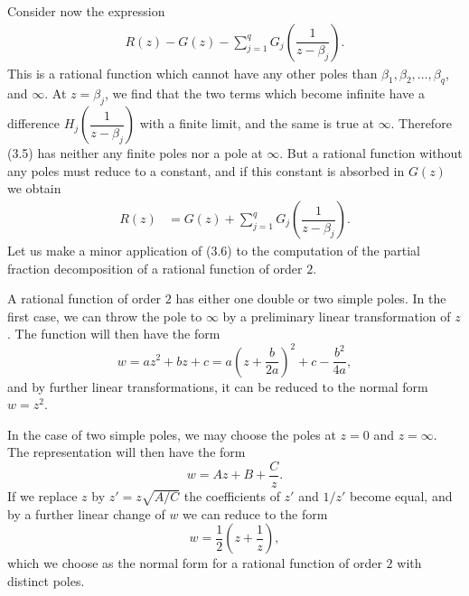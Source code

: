 Consider now the expression
\begin{align}
	R(z)-G(z)-\sum_{j=1}^{q}G_j\left(\dfrac{1}{z-\beta_j}\right).
\end{align}
This is a rational function which cannot have any other poles than $\beta_1,\beta_2,\dots,\beta_q$, and $\infty$. At $z=\beta_j$, we find that the two terms which become infinite have a difference $H_j\left(\dfrac{1}{z-\beta_j}\right)$ with a finite limit, and the same is true at $\infty$. Therefore (3.5) has neither any finite poles nor a pole at $\infty$. But a rational function without any poles must reduce to a constant, and if this constant is absorbed in $G(z)$ we obtain
\begin{align}
	R(z) &=G(z)+\sum_{j=1}^{q} G_j\left(\dfrac{1}{z-\beta_j}\right).
\end{align}
Let us make a minor application of (3.6) to the computation of the partial fraction decomposition of a rational function of order $2$.
\begin{example}
	A rational function of order $2$ has either one double or two simple poles. In the first case, we can throw the pole to $\infty$ by a preliminary linear transformation of $z$. The function will then have the form $$w=az^2+bz+c=a\left(z+\dfrac{b}{2a}\right)^2+c-\dfrac{b^2}{4a},$$ and by further linear transformations, it can be reduced to the normal form $w=z^2$. 
	
	In the case of two simple poles, we may choose the poles at $z=0$ and $z=\infty$. The representation will then have the form $$w=Az+B+\dfrac{C}{z}.$$ If we replace $z$ by $z'=z\sqrt{A/C}$ the coefficients of $z'$ and $1/z'$ become equal, and by a further linear change of $w$ we can reduce to the form $$w=\dfrac{1}{2}\left(z+\dfrac{1}{z}\right),$$ which we choose as the normal form for a rational function of order $2$ with distinct poles.
\end{example}

